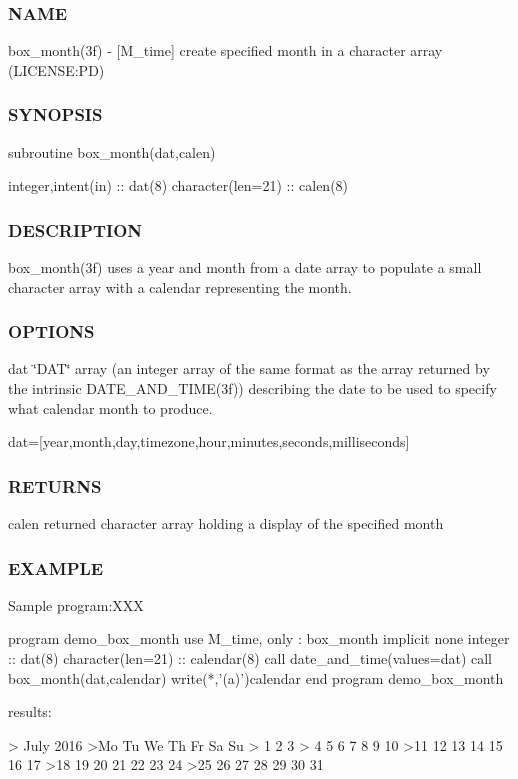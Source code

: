 \subsubsection*{N\+A\+ME}

box\+\_\+month(3f) -\/ \mbox{[}M\+\_\+time\mbox{]} create specified month in a character array (L\+I\+C\+E\+N\+SE\+:PD) 

\subsubsection*{S\+Y\+N\+O\+P\+S\+IS}

\begin{DoxyVerb}subroutine box_month(dat,calen)

 integer,intent(in)    :: dat(8)
 character(len=21)     :: calen(8)
\end{DoxyVerb}


\subsubsection*{D\+E\+S\+C\+R\+I\+P\+T\+I\+ON}

box\+\_\+month(3f) uses a year and month from a date array to populate a small character array with a calendar representing the month.

\subsubsection*{O\+P\+T\+I\+O\+NS}

dat \char`\"{}\+D\+A\+T\char`\"{} array (an integer array of the same format as the array returned by the intrinsic D\+A\+T\+E\+\_\+\+A\+N\+D\+\_\+\+T\+I\+M\+E(3f)) describing the date to be used to specify what calendar month to produce.

dat=\mbox{[}year,month,day,timezone,hour,minutes,seconds,milliseconds\mbox{]} \subsubsection*{R\+E\+T\+U\+R\+NS}

calen returned character array holding a display of the specified month

\subsubsection*{E\+X\+A\+M\+P\+LE}

\begin{DoxyVerb}Sample program:XXX

  program demo_box_month
  use M_time, only : box_month
  implicit none
  integer           :: dat(8)
  character(len=21) :: calendar(8)
     call date_and_time(values=dat)
     call box_month(dat,calendar)
     write(*,'(a)')calendar
  end program demo_box_month

results:

   >     July 2016
   >Mo Tu We Th Fr Sa Su
   >             1  2  3
   > 4  5  6  7  8  9 10
   >11 12 13 14 15 16 17
   >18 19 20 21 22 23 24
   >25 26 27 28 29 30 31
\end{DoxyVerb}


